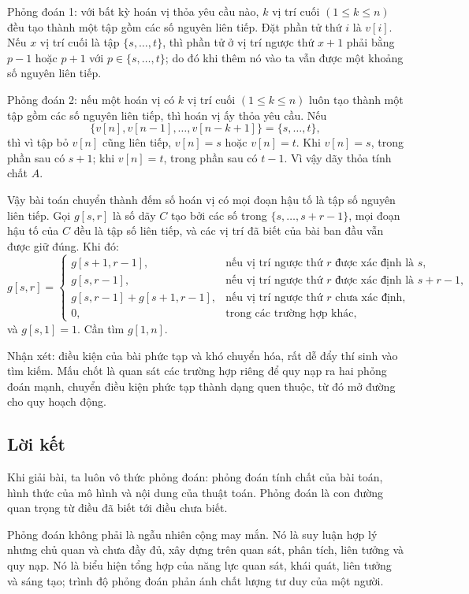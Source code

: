 \documentclass[11pt]{article}
\begin{document}
Phỏng đoán 1: với bất kỳ hoán vị thỏa yêu cầu nào, \(k\) vị trí cuối
\((1\le k\le n)\) đều tạo thành một tập gồm các số nguyên liên tiếp. Đặt phần
tử thứ \(i\) là \(v[i]\). Nếu \(x\) vị trí cuối là tập \(\{s,\ldots,t\}\),
thì phần tử ở vị trí ngược thứ \(x+1\) phải bằng \(p-1\) hoặc \(p+1\) với
\(p\in\{s,\ldots,t\}\); do đó khi thêm nó vào ta vẫn được một khoảng số
nguyên liên tiếp.

Phỏng đoán 2: nếu một hoán vị có \(k\) vị trí cuối
\((1\le k\le n)\) luôn tạo thành một tập gồm các số nguyên liên tiếp, thì
hoán vị ấy thỏa yêu cầu. Nếu
\[
\{v[n],v[n-1],\ldots,v[n-k+1]\}=\{s,\ldots,t\},
\]
thì vì tập bỏ \(v[n]\) cũng liên tiếp, \(v[n]=s\) hoặc \(v[n]=t\). Khi
\(v[n]=s\), trong phần sau có \(s+1\); khi \(v[n]=t\), trong phần sau có
\(t-1\). Vì vậy dãy thỏa tính chất \(A\).

Vậy bài toán chuyển thành đếm số hoán vị có mọi đoạn hậu tố là tập số nguyên
liên tiếp. Gọi \(g[s,r]\) là số dãy \(C\) tạo bởi các số trong
\(\{s,\ldots,s+r-1\}\), mọi đoạn hậu tố của \(C\) đều là tập số liên tiếp, và
các vị trí đã biết của bài ban đầu vẫn được giữ đúng. Khi đó:
\[
g[s,r]=
\begin{cases}
g[s+1,r-1], & \text{nếu vị trí ngược thứ } r \text{ được xác định là } s,\\
g[s,r-1], & \text{nếu vị trí ngược thứ } r \text{ được xác định là } s+r-1,\\
g[s,r-1]+g[s+1,r-1], & \text{nếu vị trí ngược thứ } r \text{ chưa xác định},\\
0, & \text{trong các trường hợp khác},
\end{cases}
\]
và \(g[s,1]=1\).
Cần tìm \(g[1,n]\).

Nhận xét: điều kiện của bài phức tạp và khó chuyển hóa, rất dễ đẩy thí sinh
vào tìm kiếm. Mấu chốt là quan sát các trường hợp riêng để quy nạp ra hai
phỏng đoán mạnh, chuyển điều kiện phức tạp thành dạng quen thuộc, từ đó mở
đường cho quy hoạch động.

\subsection{Lời kết}

Khi giải bài, ta luôn vô thức phỏng đoán: phỏng đoán tính chất của bài toán,
hình thức của mô hình và nội dung của thuật toán. Phỏng đoán là con đường
quan trọng từ điều đã biết tới điều chưa biết.

Phỏng đoán không phải là ngẫu nhiên cộng may mắn. Nó là suy luận hợp lý nhưng
chủ quan và chưa đầy đủ, xây dựng trên quan sát, phân tích, liên tưởng và quy
nạp. Nó là biểu hiện tổng hợp của năng lực quan sát, khái quát, liên tưởng và
sáng tạo; trình độ phỏng đoán phản ánh chất lượng tư duy của một người.
\end{document}
